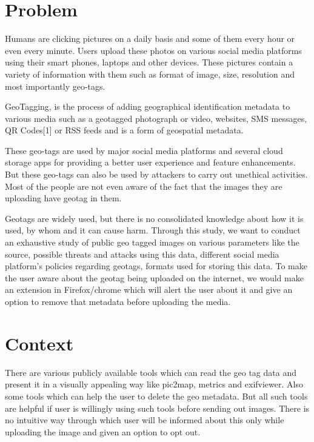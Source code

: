 \documentclass[12pt]{extarticle}
\begin{document}
    \begin{normalsize}

    	\section{Problem}

       \hspace{20} Humans are clicking pictures on a daily basis and some of them every hour or even every minute. Users upload these photos on various social media platforms using their smart phones, laptops and other devices. These pictures contain a variety of information with them such as format of image, size, resolution and most importantly geo-tags.

\vspace{10}

GeoTagging, is the process of adding geographical identification metadata to various media such as a geotagged photograph or video, websites, SMS messages, QR Codes[1] or RSS feeds and is a form of geospatial metadata.

\vspace{10}


These geo-tags are used by major social media platforms and several cloud storage apps for providing a better user experience and feature enhancements. But these geo-tags can also be used by attackers to carry out unethical activities. Most of the people are not even aware of the fact that the images they are uploading have geotag in them.

\vspace{10}


Geotags are widely used, but there is no consolidated knowledge about how it is used, by whom and it can cause harm. Through this study, we want to conduct an exhaustive study of public geo tagged images on various parameters like the source, possible threats and attacks using this data, different social media platform’s policies regarding geotags, formats used for storing this data. To make the user aware about the geotag being uploaded on the internet, we would make an extension in Firefox/chrome which will alert the user about it and give an option to remove that metadata before uploading the media.

		\section{Context}
		There are various publicly available tools which can read the geo tag data and present it in a visually appealing way like pic2map, metrics and exifviewer. Also some tools which can help the user to delete the geo metadata. But all such tools are helpful if user is willingly using such tools before sending out images. There is no intuitive way through which user will be informed about this only while uploading the image and given an option to opt out.


\end{normalsize}
\end{document}
